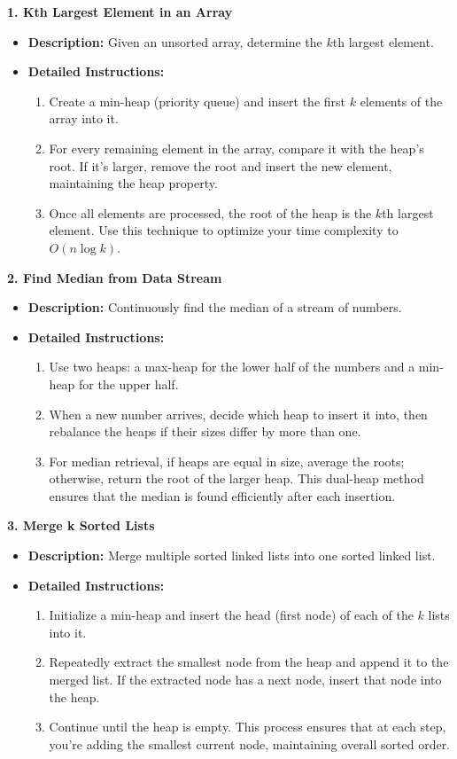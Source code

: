 \textbf{1. Kth Largest Element in an Array}
\begin{itemize}
    \item \textbf{Description:} Given an unsorted array, determine the $k$th largest element.
    \item \textbf{Detailed Instructions:}
    \begin{enumerate}
        \item Create a min-heap (priority queue) and insert the first $k$ elements of the array into it.
        \item For every remaining element in the array, compare it with the heap’s root. If it’s larger, remove the root and insert the new element, maintaining the heap property.
        \item Once all elements are processed, the root of the heap is the $k$th largest element. Use this technique to optimize your time complexity to $O(n \log k)$.
    \end{enumerate}
\end{itemize}

\textbf{2. Find Median from Data Stream}
\begin{itemize}
    \item \textbf{Description:} Continuously find the median of a stream of numbers.
    \item \textbf{Detailed Instructions:}
    \begin{enumerate}
        \item Use two heaps: a max-heap for the lower half of the numbers and a min-heap for the upper half.
        \item When a new number arrives, decide which heap to insert it into, then rebalance the heaps if their sizes differ by more than one.
        \item For median retrieval, if heaps are equal in size, average the roots; otherwise, return the root of the larger heap. This dual-heap method ensures that the median is found efficiently after each insertion.
    \end{enumerate}
\end{itemize}

\textbf{3. Merge k Sorted Lists}
\begin{itemize}
    \item \textbf{Description:} Merge multiple sorted linked lists into one sorted linked list.
    \item \textbf{Detailed Instructions:}
    \begin{enumerate}
        \item Initialize a min-heap and insert the head (first node) of each of the $k$ lists into it.
        \item Repeatedly extract the smallest node from the heap and append it to the merged list. If the extracted node has a next node, insert that node into the heap.
        \item Continue until the heap is empty. This process ensures that at each step, you’re adding the smallest current node, maintaining overall sorted order.
    \end{enumerate}
\end{itemize}

